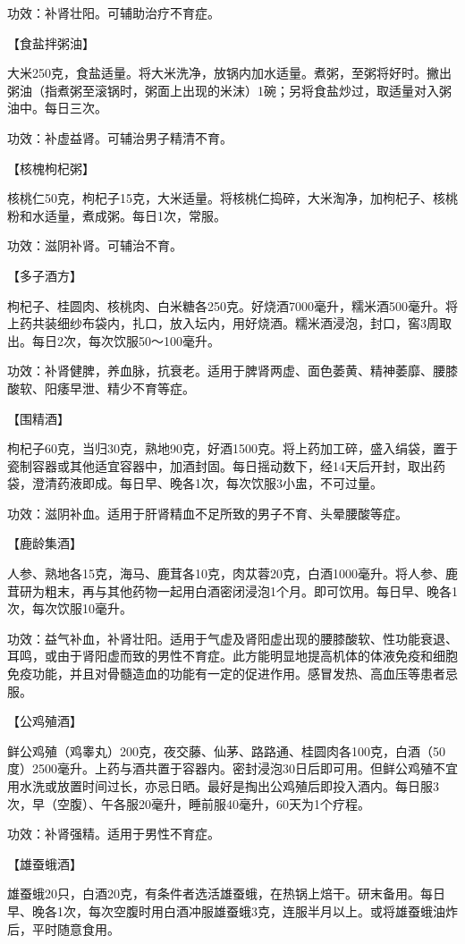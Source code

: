 \documentclass[12pt,UTF8,openany]{ctexbook}
\begin{document}
功效：补肾壮阳。可辅助治疗不育症。

【食盐拌粥油】

大米250克，食盐适量。将大米洗净，放锅内加水适量。煮粥，至粥将好时。撇出粥油（指煮粥至滚锅时，粥面上出现的米沫）1碗；另将食盐炒过，取适量对入粥油中。每日三次。

功效：补虚益肾。可辅治男子精清不育。

【核槐枸杞粥】

核桃仁50克，枸杞子15克，大米适量。将核桃仁捣碎，大米淘净，加枸杞子、核桃粉和水适量，煮成粥。每日1次，常服。

功效：滋阴补肾。可辅治不育。

【多子酒方】

枸杞子、桂圆肉、核桃肉、白米糖各250克。好烧酒7000毫升，糯米酒500毫升。将上药共装细纱布袋内，扎口，放入坛内，用好烧酒。糯米酒浸泡，封口，窖3周取出。每日2次，每次饮服50～100毫升。

功效：补肾健脾，养血脉，抗衰老。适用于脾肾两虚、面色萎黄、精神萎靡、腰膝酸软、阳痿早泄、精少不育等症。

【围精酒】

枸杞子60克，当归30克，熟地90克，好酒1500克。将上药加工碎，盛入绢袋，置于瓷制容器或其他适宜容器中，加酒封固。每日摇动数下，经14天后开封，取出药袋，澄清药液即成。每日早、晚各1次，每次饮服3小盅，不可过量。

功效：滋阴补血。适用于肝肾精血不足所致的男子不育、头晕腰酸等症。

【鹿龄集酒】

人参、熟地各15克，海马、鹿茸各10克，肉苁蓉20克，白酒1000毫升。将人参、鹿茸研为粗末，再与其他药物一起用白酒密闭浸泡1个月。即可饮用。每日早、晚各1次，每次饮服10毫升。

功效：益气补血，补肾壮阳。适用于气虚及肾阳虚出现的腰膝酸软、性功能衰退、耳鸣，或由于肾阳虚而致的男性不育症。此方能明显地提高机体的体液免疫和细胞免疫功能，并且对骨髓造血的功能有一定的促进作用。感冒发热、高血压等患者忌服。

【公鸡殖酒】

鲜公鸡殖（鸡睾丸）200克，夜交藤、仙茅、路路通、桂圆肉各100克，白酒（50度）2500毫升。上药与酒共置于容器内。密封浸泡30日后即可用。但鲜公鸡殖不宜用水洗或放置时间过长，亦忌日晒。最好是掏出公鸡殖后即投入酒内。每日服3次，早（空腹）、午各服20毫升，睡前服40毫升，60天为1个疗程。

功效：补肾强精。适用于男性不育症。

【雄蚕蛾酒】

雄蚕蛾20只，白酒20克，有条件者选活雄蚕蛾，在热锅上焙干。研末备用。每日早、晚各1次，每次空腹时用白酒冲服雄蚕蛾3克，连服半月以上。或将雄蚕蛾油炸后，平时随意食用。
\end{document}
